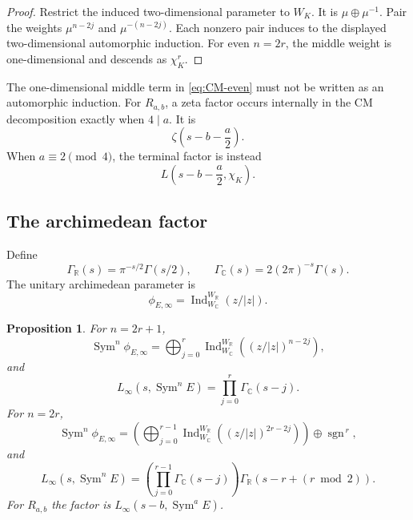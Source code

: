 \documentclass[11pt,reqno]{amsart}
\newtheorem{proposition}[theorem]{Proposition}
\theoremstyle{definition}
\theoremstyle{remark}
\newcommand{\C}{\mathbb C}
\newcommand{\Sym}{\operatorname{Sym}}
\newcommand{\Ind}{\operatorname{Ind}}
\newcommand{\GammaR}{\Gamma_{\mathbb R}}
\newcommand{\GammaC}{\Gamma_{\mathbb C}}
\begin{document}
\begin{proof}
Restrict the induced two-dimensional parameter to $W_K$.  It is
$\mu\oplus\mu^{-1}$.  Pair the weights $\mu^{n-2j}$ and
$\mu^{-(n-2j)}$.  Each nonzero pair induces to the displayed
two-dimensional automorphic induction.  For even $n=2r$, the middle weight is
one-dimensional and descends as $\chi_K^r$.
\end{proof}

The one-dimensional middle term in \eqref{eq:CM-even} must not be written as
an automorphic induction.  For $R_{a,b}$, a zeta factor occurs internally in
the CM decomposition exactly when $4\mid a$.  It is
\begin{equation}\label{eq:CM-zeta}
 \zeta\left(s-b-\frac a2\right).
\end{equation}
When $a\equiv2\pmod4$, the terminal factor is instead
\begin{equation}\label{eq:CM-quadratic}
 L\left(s-b-\frac a2,\chi_K\right).
\end{equation}

\subsection{The archimedean factor}

Define
\begin{equation*}
 \GammaR(s)=\pi^{-s/2}\Gamma(s/2),
 \qquad
 \GammaC(s)=2(2\pi)^{-s}\Gamma(s).
\end{equation*}
The unitary archimedean parameter is
\begin{equation*}
 \phi_{E,\infty}
 =\Ind_{W_\C}^{W_\mathbb R}(z/|z|).
\end{equation*}

\begin{proposition}\label{prop:infinity}
For $n=2r+1$,
\begin{equation}\label{eq:infinity-odd-unitary}
 \Sym^n\phi_{E,\infty}
 =
 \bigoplus_{j=0}^{r}
 \Ind_{W_\C}^{W_\mathbb R}
 \left((z/|z|)^{n-2j}\right),
\end{equation}
and
\begin{equation}\label{eq:infinity-odd-motivic}
 L_\infty(s,\Sym^nE)
 =
 \prod_{j=0}^{r}\GammaC(s-j).
\end{equation}
For $n=2r$,
\begin{equation}\label{eq:infinity-even-unitary}
 \Sym^n\phi_{E,\infty}
 =
 \left(
 \bigoplus_{j=0}^{r-1}
 \Ind_{W_\C}^{W_\mathbb R}
 ((z/|z|)^{2r-2j})
 \right)
 \oplus\operatorname{sgn}^{\,r},
\end{equation}
and
\begin{equation}\label{eq:infinity-even-motivic}
 L_\infty(s,\Sym^nE)
 =
 \left(\prod_{j=0}^{r-1}\GammaC(s-j)\right)
 \GammaR(s-r+(r\bmod2)).
\end{equation}
For $R_{a,b}$ the factor is $L_\infty(s-b,\Sym^aE)$.
\end{proposition}
\end{document}
